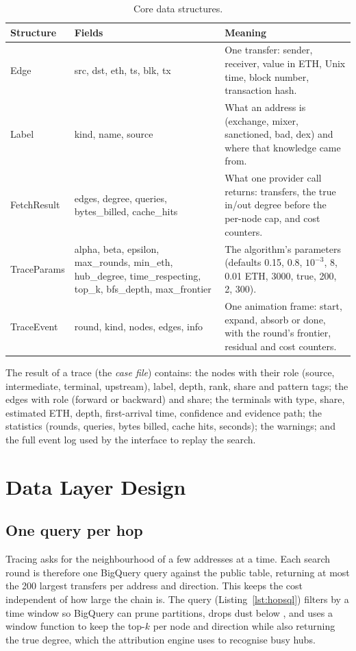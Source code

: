 \begin{table}[H]
\centering\small\singlespacing
\begin{tabular}{p{2.6cm} p{4.0cm} p{6.4cm}}
\toprule
\textbf{Structure} & \textbf{Fields} & \textbf{Meaning}\\
\midrule
Edge & src, dst, eth, ts, blk, tx & One transfer: sender, receiver, value in ETH, Unix time, block number, transaction hash.\\
Label & kind, name, source & What an address is (exchange, mixer, sanctioned, bad, dex) and where that knowledge came from.\\
FetchResult & edges, degree, queries, bytes\_billed, cache\_hits & What one provider call returns: transfers, the true in/out degree before the per-node cap, and cost counters.\\
TraceParams & alpha, beta, epsilon, max\_rounds, min\_eth, hub\_degree, time\_respecting, top\_k, bfs\_depth, max\_frontier & The algorithm's parameters (defaults 0.15, 0.8, $10^{-3}$, 8, 0.01 ETH, 3000, true, 200, 2, 300).\\
TraceEvent & round, kind, nodes, edges, info & One animation frame: start, expand, absorb or done, with the round's frontier, residual and cost counters.\\
\bottomrule
\end{tabular}
\caption{Core data structures.}
\label{tab:datamodel}
\end{table}

The result of a trace (the \emph{case file}) contains: the nodes with their role (source, intermediate, terminal, upstream), label, depth, rank, share and pattern tags; the edges with role (forward or backward) and share; the terminals with type, share, estimated ETH, depth, first-arrival time, confidence and evidence path; the statistics (rounds, queries, bytes billed, cache hits, seconds); the warnings; and the full event log used by the interface to replay the search.

\section{Data Layer Design}
\subsection{One query per hop}
Tracing asks for the neighbourhood of a few addresses at a time. Each search round is therefore one BigQuery query against the public  table, returning at most the 200 largest transfers per address and direction. This keeps the cost independent of how large the chain is. The query (Listing~\ref{lst:hopsql}) filters by a time window so BigQuery can prune partitions, drops dust below , and uses a window function to keep the top-$k$ per node and direction while also returning the true degree, which the attribution engine uses to recognise busy hubs.

